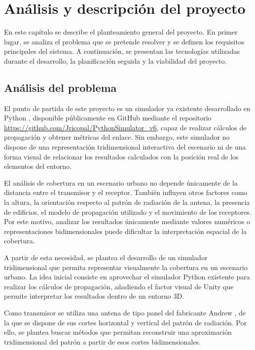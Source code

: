 \chapter{Análisis y descripción del proyecto}
\label{chap:analisis_y_descripcion}

En este capítulo se describe el planteamiento general del proyecto. En primer lugar, se analiza el problema que se pretende resolver y se definen los requisitos principales del sistema. A continuación, se presentan las tecnologías utilizadas durante el desarrollo, la planificación seguida y la viabilidad del proyecto.

\section{Análisis del problema}

El punto de partida de este proyecto es un simulador ya existente desarrollado en Python \cite{9932595}, disponible públicamente en GitHub mediante el repositorio \url{https://github.com/Jricopal/PythonSimulator_v6}, capaz de realizar cálculos de propagación y obtener métricas del enlace. Sin embargo, este simulador no dispone de una representación tridimensional interactiva del escenario ni de una forma visual de relacionar los resultados calculados con la posición real de los elementos del entorno.

El análisis de cobertura en un escenario urbano no depende únicamente de la distancia entre el transmisor y el receptor. También influyen otros factores como la altura, la orientación respecto al patrón de radiación de la antena, la presencia de edificios, el modelo de propagación utilizado y el movimiento de los receptores. Por este motivo, analizar los resultados únicamente mediante valores numéricos o representaciones bidimensionales puede dificultar la interpretación espacial de la cobertura.

A partir de esta necesidad, se plantea el desarrollo de un simulador tridimensional que permita representar visualmente la cobertura en un escenario urbano. La idea inicial consiste en aprovechar el simulador Python existente para realizar los cálculos de propagación, añadiendo el factor visual de Unity que permite interpretar los resultados dentro de un entorno 3D.

Como transmisor se utiliza una antena de tipo panel del fabricante Andrew \cite{andrew_hwxx_product}, de la que se dispone de sus cortes horizontal y vertical del patrón de radiación. Por ello, se plantea buscar métodos que permitan reconstruir una aproximación tridimensional del patrón a partir de esos cortes bidimensionales.

